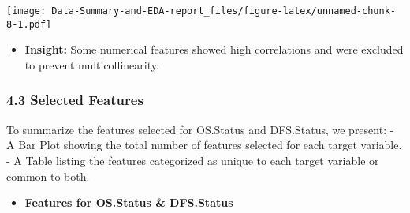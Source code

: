 \documentclass[
]{article}
\providecommand{\tightlist}{%
  \setlength{\itemsep}{0pt}\setlength{\parskip}{0pt}}
\begin{document}
\texttt{[image: Data-Summary-and-EDA-report\_files/figure-latex/unnamed-chunk-8-1.pdf]}

\begin{itemize}
\tightlist
\item
  \textbf{Insight:} Some numerical features showed high correlations and
  were excluded to prevent multicollinearity.
\end{itemize}

\subsubsection{4.3 Selected Features}\label{selected-features}

To summarize the features selected for OS.Status and DFS.Status, we
present: - A Bar Plot showing the total number of features selected for
each target variable. - A Table listing the features categorized as
unique to each target variable or common to both.

\begin{itemize}
\tightlist
\item
  \textbf{Features for OS.Status \& DFS.Status}
\end{itemize}
\end{document}
